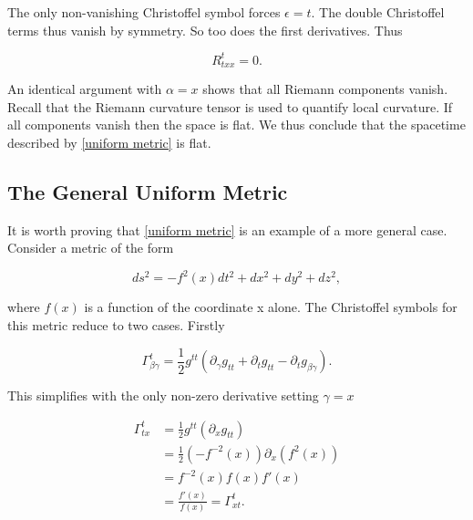 \documentclass[11pt]{article}
\begin{document}
The only non-vanishing Christoffel symbol forces $\epsilon = t$. The double Christoffel terms thus vanish by symmetry. So too does the first derivatives. Thus

\begin{equation}
    \label{Riemmann-curv-formula-t-x-2}
    R^{t} _{t x x} = 0.
\end{equation}

An identical argument with $\alpha = x$ shows that all Riemann components vanish. Recall that the Riemann curvature tensor is used to quantify local curvature. If all components vanish then the space is flat. We thus conclude that the spacetime described by \eqref{uniform metric} is flat.

\subsection{The General Uniform Metric}

It is worth proving that \eqref{uniform metric} is an example of a more general case. Consider a metric of the form

\begin{equation}
    \label{gen-uni-metric}
    ds^2  = -f^2(x) dt^2 + dx^2 + dy^2 + dz^2,
\end{equation}

where $f(x)$ is a function of the coordinate x alone. The Christoffel symbols for this metric reduce to two cases. Firstly

\begin{equation}
    \label{christ-awful-t-f}
    \Gamma^{t}_{\beta \gamma} = \frac{1}{2} g^{t t} \left( \partial_{\gamma} g_{t t} + \partial_{t} g_{t t} - \partial_{t} g_{\beta \gamma}\right).
\end{equation}

This simplifies with the only non-zero derivative setting $\gamma = x$

\begin{equation}
    \label{christ-awful-t-f2}
    \begin{split}
    \Gamma^{t}_{t x} & = \frac{1}{2} g^{t t} \left( \partial_{x} g_{t t}\right) \\
    & = \frac{1}{2} (-f^{-2}(x)) \partial_{x} (f^2(x)) \\
    & = f^{-2}(x) f(x) f'(x) \\
    & = \frac{f'(x)}{f(x)} = \Gamma^{t}_{x t}.
    \end{split}
\end{equation}
\end{document}
